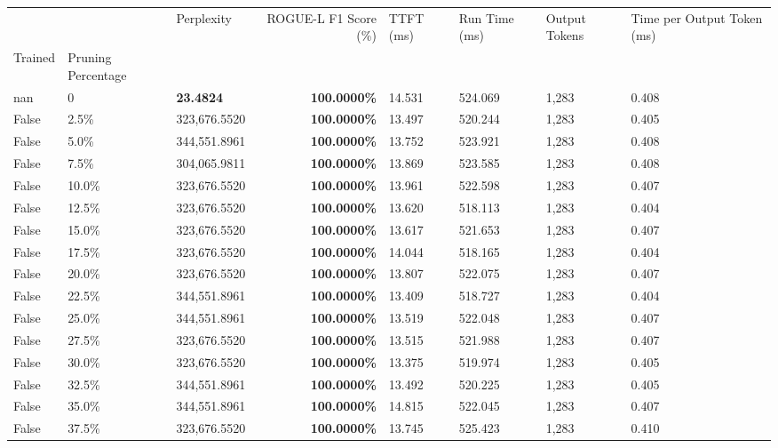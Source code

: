 \begin{table}[H]
\begin{tabular}{lllrllll}
\toprule
 &  & Perplexity & ROGUE-L F1 Score (\%) & TTFT (ms) & Run Time (ms) & Output Tokens & Time per Output Token (ms) \\
Trained & Pruning Percentage &  &  &  &  &  &  \\
\midrule
nan & 0 & \bfseries 23.4824 & \bfseries 100.0000\% & 14.531 & 524.069 & 1,283 & 0.408 \\
\cline{1-8}
False & 2.5\% & 323,676.5520 & \bfseries \color{red} 100.0000\% & 13.497 & 520.244 & 1,283 & 0.405 \\
\cline{1-8}
False & 5.0\% & 344,551.8961 & \bfseries \color{red} 100.0000\% & 13.752 & 523.921 & 1,283 & 0.408 \\
\cline{1-8}
False & 7.5\% & \color{red} 304,065.9811 & \bfseries \color{red} 100.0000\% & 13.869 & 523.585 & 1,283 & 0.408 \\
\cline{1-8}
False & 10.0\% & 323,676.5520 & \bfseries \color{red} 100.0000\% & 13.961 & 522.598 & 1,283 & 0.407 \\
\cline{1-8}
False & 12.5\% & 323,676.5520 & \bfseries \color{red} 100.0000\% & 13.620 & 518.113 & 1,283 & 0.404 \\
\cline{1-8}
False & 15.0\% & 323,676.5520 & \bfseries \color{red} 100.0000\% & 13.617 & 521.653 & 1,283 & 0.407 \\
\cline{1-8}
False & 17.5\% & 323,676.5520 & \bfseries \color{red} 100.0000\% & 14.044 & 518.165 & 1,283 & 0.404 \\
\cline{1-8}
False & 20.0\% & 323,676.5520 & \bfseries \color{red} 100.0000\% & 13.807 & 522.075 & 1,283 & 0.407 \\
\cline{1-8}
False & 22.5\% & 344,551.8961 & \bfseries \color{red} 100.0000\% & 13.409 & 518.727 & 1,283 & 0.404 \\
\cline{1-8}
False & 25.0\% & 344,551.8961 & \bfseries \color{red} 100.0000\% & 13.519 & 522.048 & 1,283 & 0.407 \\
\cline{1-8}
False & 27.5\% & 323,676.5520 & \bfseries \color{red} 100.0000\% & 13.515 & 521.988 & 1,283 & 0.407 \\
\cline{1-8}
False & 30.0\% & 323,676.5520 & \bfseries \color{red} 100.0000\% & 13.375 & 519.974 & 1,283 & 0.405 \\
\cline{1-8}
False & 32.5\% & 344,551.8961 & \bfseries \color{red} 100.0000\% & 13.492 & 520.225 & 1,283 & 0.405 \\
\cline{1-8}
False & 35.0\% & 344,551.8961 & \bfseries \color{red} 100.0000\% & 14.815 & 522.045 & 1,283 & 0.407 \\
\cline{1-8}
False & 37.5\% & 323,676.5520 & \bfseries \color{red} 100.0000\% & 13.745 & 525.423 & 1,283 & 0.410 \\

\end{tabular}
\end{table}
